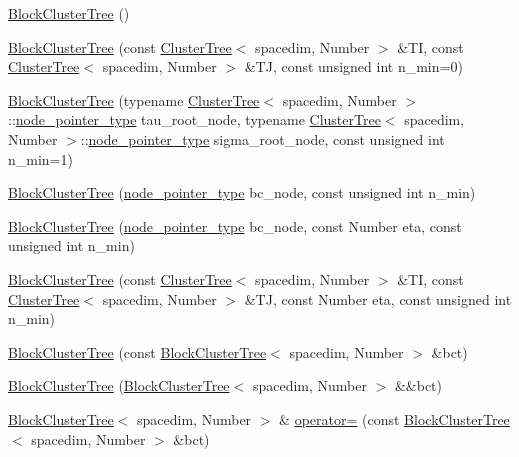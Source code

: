 \begin{DoxyCompactItemize}
\item 
\hyperlink{classBlockClusterTree_a20b1ec6a9e81c252b1994c5a99c44af4}{Block\+Cluster\+Tree} ()
\item 
\hyperlink{classBlockClusterTree_a61d415eda9bfffa9e0aa5492b461edab}{Block\+Cluster\+Tree} (const \hyperlink{classClusterTree}{Cluster\+Tree}$<$ spacedim, Number $>$ \&TI, const \hyperlink{classClusterTree}{Cluster\+Tree}$<$ spacedim, Number $>$ \&TJ, const unsigned int n\+\_\+min=0)
\item 
\hyperlink{classBlockClusterTree_a3073c9b5669e356c9c37ccd0a13ed8b3}{Block\+Cluster\+Tree} (typename \hyperlink{classClusterTree}{Cluster\+Tree}$<$ spacedim, Number $>$\+::\hyperlink{classTreeNode}{node\+\_\+pointer\+\_\+type} tau\+\_\+root\+\_\+node, typename \hyperlink{classClusterTree}{Cluster\+Tree}$<$ spacedim, Number $>$\+::\hyperlink{classTreeNode}{node\+\_\+pointer\+\_\+type} sigma\+\_\+root\+\_\+node, const unsigned int n\+\_\+min=1)
\item 
\hyperlink{classBlockClusterTree_ace6087e8fe7dc3d737ff6b4cd97070fc}{Block\+Cluster\+Tree} (\hyperlink{classTreeNode}{node\+\_\+pointer\+\_\+type} bc\+\_\+node, const unsigned int n\+\_\+min)
\item 
\hyperlink{classBlockClusterTree_a522ad51298f5b58b948e435a9e2d2a40}{Block\+Cluster\+Tree} (\hyperlink{classTreeNode}{node\+\_\+pointer\+\_\+type} bc\+\_\+node, const Number eta, const unsigned int n\+\_\+min)
\item 
\hyperlink{classBlockClusterTree_aefb93288ece0e153eb5843d1df21a2a6}{Block\+Cluster\+Tree} (const \hyperlink{classClusterTree}{Cluster\+Tree}$<$ spacedim, Number $>$ \&TI, const \hyperlink{classClusterTree}{Cluster\+Tree}$<$ spacedim, Number $>$ \&TJ, const Number eta, const unsigned int n\+\_\+min)
\item 
\hyperlink{classBlockClusterTree_a1c31aecfd91383f8b96601fd2b63dd62}{Block\+Cluster\+Tree} (const \hyperlink{classBlockClusterTree}{Block\+Cluster\+Tree}$<$ spacedim, Number $>$ \&bct)
\item 
\hyperlink{classBlockClusterTree_ae3bb67cdcb7868237063c8003d4079ab}{Block\+Cluster\+Tree} (\hyperlink{classBlockClusterTree}{Block\+Cluster\+Tree}$<$ spacedim, Number $>$ \&\&bct)
\item 
\hyperlink{classBlockClusterTree}{Block\+Cluster\+Tree}$<$ spacedim, Number $>$ \& \hyperlink{classBlockClusterTree_a85553cc442e419b8d707720312118328}{operator=} (const \hyperlink{classBlockClusterTree}{Block\+Cluster\+Tree}$<$ spacedim, Number $>$ \&bct)

\end{DoxyCompactItemize}
